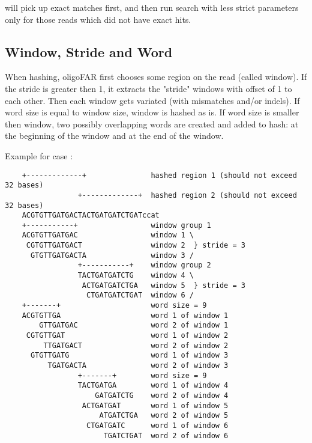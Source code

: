 \documentclass[english,letter]{article}
\begin{document}
	         

    will pick up exact matches first, and then run search with less strict 
    parameters only for those reads which did not have exact hits.

\subsection{Window, Stride and Word}
    When hashing, oligoFAR first chooses some region on the read (called window).
    If the stride is greater then 1, it extracts the "stride" windows with offset 
    of 1 to each other. Then each window gets variated (with mismatches and/or 
    indels). If word size is equal to window size, window is hashed as is. If 
    word size is smaller then window, two possibly overlapping words are created
    and added to hash: at the beginning of the window and at the end of the 
    window.

    Example for case    :
    
	\begin{verbatim}
    +-------------+               hashed region 1 (should not exceed 32 bases)
                 +-------------+  hashed region 2 (should not exceed 32 bases)
    ACGTGTTGATGACTACTGATGATCTGATccat
    +-----------+                 window group 1
    ACGTGTTGATGAC                 window 1 \
     CGTGTTGATGACT                window 2  } stride = 3
      GTGTTGATGACTA               window 3 /
                 +-----------+    window group 2
                 TACTGATGATCTG    window 4 \
                  ACTGATGATCTGA   window 5  } stride = 3
                   CTGATGATCTGAT  window 6 /
    +-------+                     word size = 9
    ACGTGTTGA                     word 1 of window 1
        GTTGATGAC                 word 2 of window 1
     CGTGTTGAT                    word 1 of window 2
         TTGATGACT                word 2 of window 2
      GTGTTGATG                   word 1 of window 3
          TGATGACTA               word 2 of window 3
                 +-------+        word size = 9
                 TACTGATGA        word 1 of window 4
                     GATGATCTG    word 2 of window 4
                  ACTGATGAT       word 1 of window 5
                      ATGATCTGA   word 2 of window 5
                   CTGATGATC      word 1 of window 6
                       TGATCTGAT  word 2 of window 6
   \end{verbatim}
\end{document}
